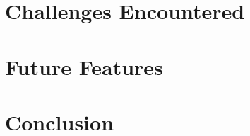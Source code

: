 \documentclass[pageno]{jpaper}
\begin{document}
\begin{doublespacing}
\section{Challenges Encountered}



\hypertarget{sec:future_features}{}
\section{Future Features}


\hypertarget{sec:conclusion}{}
\section{Conclusion}

\end{doublespacing} 


\end{document}
